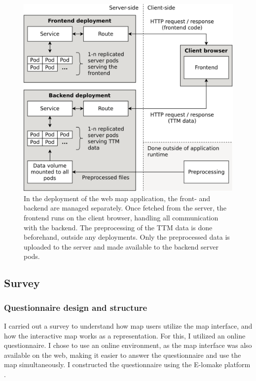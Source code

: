 \begin{figure}[H]
	\centering
	\includegraphics[width=\diagramwidth]{visual/figures/diagrams/architecture.png}
	\caption{
		In the deployment of the web map application,
		the front- and backend are managed separately.
		Once fetched from the server,
		the frontend runs on the client browser,
		handling all communication with the backend.
		The preprocessing of the TTM data is done beforehand, outside any deployments.
		Only the preprocessed data is uploaded to the server and made available to the
		backend server pods.
	}
	\label{fig:architechture}
\end{figure}


\subsection{Survey}

\subsubsection{Questionnaire design and structure}

I carried out a survey to
understand how map users utilize the map interface,
and how the interactive map works as a representation.
For this, I utilized an online questionnaire.  %
I chose to use an online environment,
as the map interface was also available on the web,
making it easier to answer the questionnaire and use the map simultaneously.
I constructed the questionnaire using the E-lomake platform
\parencite{elomake}.

